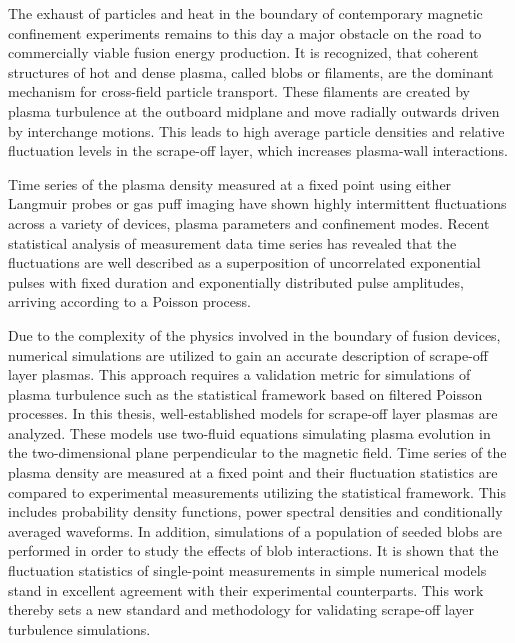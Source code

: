 The exhaust of particles and heat in the boundary of contemporary magnetic confinement
experiments remains to this day a major obstacle on the road to commercially viable
fusion energy production. It is recognized, that coherent structures of hot and dense
plasma, called blobs or filaments, are the dominant mechanism for cross-field particle
transport. These filaments are created by plasma turbulence at the outboard midplane and
move radially outwards driven by interchange motions. This leads to high average
particle densities and relative fluctuation levels in the scrape-off layer, which
increases plasma-wall interactions.

Time series of the plasma density measured at a fixed point using either Langmuir probes
or gas puff imaging have shown highly intermittent fluctuations across a variety of
devices, plasma parameters and confinement modes. Recent statistical analysis of
measurement data time series has revealed that the fluctuations are well described as a
superposition of uncorrelated exponential pulses with fixed duration and exponentially
distributed pulse amplitudes, arriving according to a Poisson process. 

Due to the complexity of the physics involved in the boundary of fusion devices,
numerical simulations are utilized to gain an accurate description of scrape-off layer
plasmas. This approach requires a validation metric for simulations of plasma turbulence
such as the statistical framework based on filtered Poisson processes. In this thesis,
well-established models for scrape-off layer plasmas are analyzed. These models use
two-fluid equations simulating plasma evolution in the two-dimensional plane
perpendicular to the magnetic field. Time series of the plasma density are measured at a
fixed point and their fluctuation statistics are compared to experimental measurements
utilizing the statistical framework. This includes probability density functions, power
spectral densities and conditionally averaged waveforms. In addition, simulations of a
population of seeded blobs are performed in order to study the effects of blob
interactions. It is shown that the fluctuation statistics of single-point measurements
in simple numerical models stand in excellent agreement with their experimental
counterparts. This work thereby sets a new standard and methodology for validating
scrape-off layer turbulence simulations. 

